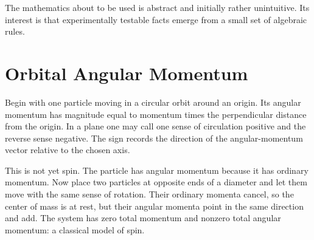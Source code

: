\begin{classroomqa}
\end{classroomqa}

The mathematics about to be used is abstract and initially rather unintuitive. Its interest is that experimentally testable facts emerge from a small set of algebraic rules.

\section{Orbital Angular Momentum}

Begin with one particle moving in a circular orbit around an origin. Its angular momentum has magnitude equal to momentum times the perpendicular distance from the origin. In a plane one may call one sense of circulation positive and the reverse sense negative. The sign records the direction of the angular-momentum vector relative to the chosen axis.

This is not yet spin. The particle has angular momentum because it has ordinary momentum. Now place two particles at opposite ends of a diameter and let them move with the same sense of rotation. Their ordinary momenta cancel, so the center of mass is at rest, but their angular momenta point in the same direction and add. The system has zero total momentum and nonzero total angular momentum: a classical model of spin.

